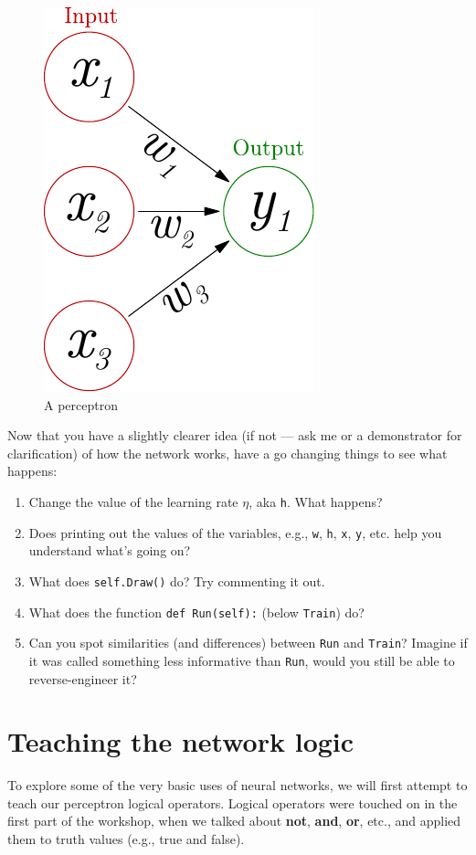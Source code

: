 \documentclass[a4paper,10pt]{article}
\begin{document}
\begin{figure}[hb]
 \centering
 \includegraphics{../slides/fig/perceptron_maths.pdf}
 \caption{A perceptron}
 \label{fig:perceptron}
\end{figure}

Now that you have a slightly clearer idea (if not --- ask me or a demonstrator for clarification) of how the network works, have a go changing things to see what happens:

\begin{enumerate}
 \item Change the value of the learning rate $\eta$, aka \texttt{h}. What happens?
 \item Does printing out the values of the variables, e.g., \texttt{w}, \texttt{h}, \texttt{x}, \texttt{y}, etc. help you understand what's going on?
 \item What does \texttt{self.Draw()} do? Try commenting it out.
 \item What does the function \texttt{def Run(self):} (below \texttt{Train}) do?
 \item Can you spot similarities (and differences) between \texttt{Run} and \texttt{Train}? Imagine if it was called something less informative than  \texttt{Run}, would you still be able to reverse-engineer it?
\end{enumerate}




\section{Teaching the network logic}
To explore some of the  very basic uses of neural networks, we will first attempt to teach our perceptron logical operators. Logical operators were touched on in the first part of the workshop, when we talked about \textbf{not}, \textbf{and}, \textbf{or}, etc., and applied them to truth values (e.g., true and false).
\end{document}

